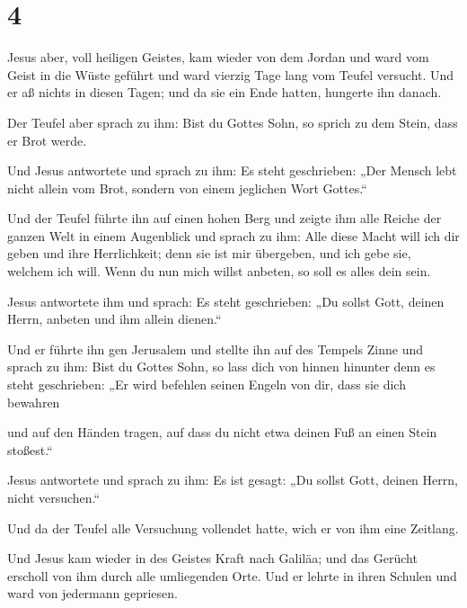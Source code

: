 \hypertarget{section-3}{%
\section{4}\label{section-3}}

 Jesus aber, voll heiligen Geistes, kam wieder von dem
Jordan und ward vom Geist in die Wüste geführt  und ward
vierzig Tage lang vom Teufel versucht. Und er aß nichts in diesen Tagen;
und da sie ein Ende hatten, hungerte ihn danach.

 Der Teufel aber sprach zu ihm: Bist du Gottes Sohn, so
sprich zu dem Stein, dass er Brot werde.

 Und Jesus antwortete und sprach zu ihm: Es steht
geschrieben: „Der Mensch lebt nicht allein vom Brot, sondern von einem
jeglichen Wort Gottes.``

 Und der Teufel führte ihn auf einen hohen Berg und zeigte
ihm alle Reiche der ganzen Welt in einem Augenblick  und
sprach zu ihm: Alle diese Macht will ich dir geben und ihre
Herrlichkeit; denn sie ist mir übergeben, und ich gebe sie, welchem ich
will.  Wenn du nun mich willst anbeten, so soll es alles
dein sein.

 Jesus antwortete ihm und sprach: Es steht geschrieben:
„Du sollst Gott, deinen Herrn, anbeten und ihm allein dienen.``

 Und er führte ihn gen Jerusalem und stellte ihn auf des
Tempels Zinne und sprach zu ihm: Bist du Gottes Sohn, so lass dich von
hinnen hinunter  denn es steht geschrieben: „Er wird
befehlen seinen Engeln von dir, dass sie dich bewahren

 und auf den Händen tragen, auf dass du nicht etwa deinen
Fuß an einen Stein stoßest.``

 Jesus antwortete und sprach zu ihm: Es ist gesagt: „Du
sollst Gott, deinen Herrn, nicht versuchen.``

 Und da der Teufel alle Versuchung vollendet hatte, wich
er von ihm eine Zeitlang.

 Und Jesus kam wieder in des Geistes Kraft nach Galiläa;
und das Gerücht erscholl von ihm durch alle umliegenden Orte.
 Und er lehrte in ihren Schulen und ward von jedermann
gepriesen.

